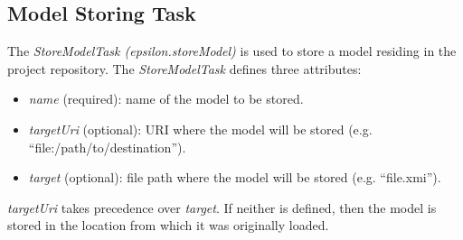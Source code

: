 \subsection{Model Storing Task}

The \textit{StoreModelTask (epsilon.storeModel)} is used to store a model
residing in the project repository. The \textit{StoreModelTask} defines three
attributes:

\begin{itemize}
\item \textit{name} (required): name of the model to be stored.
\item \textit{targetUri} (optional): URI where the model will be stored (e.g.
  ``file:/path/to/destination'').
\item \textit{target} (optional): file path where the model will be stored (e.g.
  ``file.xmi'').
\end{itemize}

\textit{targetUri} takes precedence over \textit{target}. If neither is defined,
then the model is stored in the location from which it was originally loaded.
